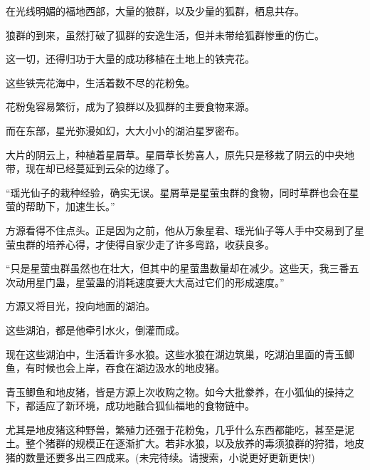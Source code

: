 \begin{this_body}
在光线明媚的福地西部，大量的狼群，以及少量的狐群，栖息共存。

狼群的到来，虽然打破了狐群的安逸生活，但并未带给狐群惨重的伤亡。

这一切，还得归功于大量的成功移植在土地上的铁壳花。

这些铁壳花海中，生活着数不尽的花粉兔。

花粉兔容易繁衍，成为了狼群以及狐群的主要食物来源。

而在东部，星光弥漫如幻，大大小小的湖泊星罗密布。

大片的阴云上，种植着星屑草。星屑草长势喜人，原先只是移栽了阴云的中央地带，现在却已经蔓延到云朵的边缘了。

“瑶光仙子的栽种经验，确实无误。星屑草是星萤虫群的食物，同时草群也会在星萤的帮助下，加速生长。”

方源看得不住点头。正是因为之前，他从万象星君、瑶光仙子等人手中交易到了星萤虫群的培养心得，才使得自家少走了许多弯路，收获良多。

“只是星萤虫群虽然也在壮大，但其中的星萤蛊数量却在减少。这些天，我三番五次动用星门蛊，星萤蛊的消耗速度要大大高过它们的形成速度。”

方源又将目光，投向地面的湖泊。

这些湖泊，都是他牵引水火，倒灌而成。

现在这些湖泊中，生活着许多水狼。这些水狼在湖边筑巢，吃湖泊里面的青玉鲫鱼，有时候也会上岸，吞食在湖边汲水的地皮猪。

青玉鲫鱼和地皮猪，皆是方源上次收购之物。如今大批豢养，在小狐仙的操持之下，都适应了新环境，成功地融合狐仙福地的食物链中。

尤其是地皮猪这种野兽，繁殖力还强于花粉兔，几乎什么东西都能吃，甚至是泥土。整个猪群的规模正在逐渐扩大。若非水狼，以及放养的毒须狼群的狩猎，地皮猪的数量还要多出三四成来。(未完待续。请搜索，小说更好更新更快!)

\end{this_body}

